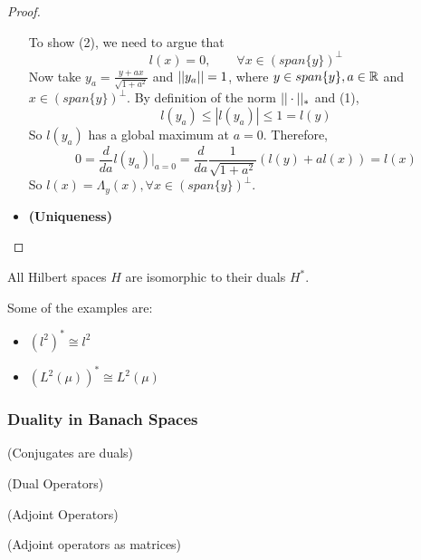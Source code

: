 \documentclass{article}
\begin{document}
\begin{proof}
\begin{itemize}
        To show (2), we need to argue that 
        \begin{equation*}
            l(x)=0, \qquad \forall x \in (span\{y\})^{\perp}
        \end{equation*}  
        Now take $y_a = \frac{y+ax}{\sqrt{1+a^2}}$ and $||y_a||=1$, where $y \in span\{y\}, a\in \mathbb{R}$ and $x \in (span\{y\})^{\perp}$. By definition of the norm $||\cdot||_*$ and (1),  
        \begin{equation*}
            l(y_a)  \leq |l(y_a)| \leq 1 = l(y)
        \end{equation*}  
        So $l(y_a)$ has a global maximum at $a=0$. Therefore,  
        \begin{equation*}
            0 = \frac{d}{da} l(y_a) \Bigr|_{a=0} = \frac{d}{da} \frac{1}{\sqrt{1+a^2}} (l(y)+al(x))=l(x)
        \end{equation*}  
        So $l(x)=\Lambda_y(x), \forall x \in (span\{y\})^{\perp}$.
        
        \item \textbf{(Uniqueness)}  
    \end{itemize}
\end{proof}

\begin{cor}
    All Hilbert spaces $H$ are isomorphic to their duals $H^*$.
\end{cor}
\begin{eg}
    Some of the examples are:  
    \begin{itemize}
        \item $(l^2)^* \cong l^2$
        \item $(L^2(\mu))^* \cong L^2(\mu)$
    \end{itemize}
\end{eg}
\subsubsection{Duality in Banach Spaces}  

\begin{thm}
    (Conjugates are duals)
\end{thm}  

\begin{defn}
    (Dual Operators)
\end{defn}  

\begin{defn}
    (Adjoint Operators)
\end{defn}  
\begin{eg}
    (Adjoint operators as matrices)
\end{eg}  

\begin{remark}
    
\end{remark}
\end{document}
